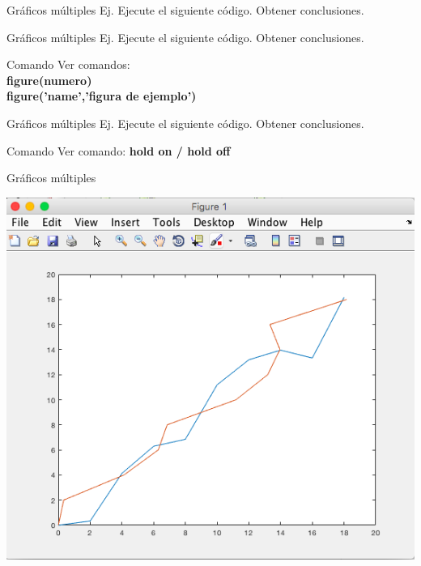 \documentclass{bredelebeamer}
\begin{document}
\begin{frame}{Gráficos múltiples}
Ej. Ejecute el siguiente código. Obtener conclusiones.

\end{frame}

\begin{frame}{Gráficos múltiples}
Ej. Ejecute el siguiente código. Obtener conclusiones.

\begin{exampleblock}{Comando}
Ver comandos:\\ \textbf{figure(numero)}\\ \textbf{figure('name','figura de ejemplo')}
\end{exampleblock}
\end{frame}

\begin{frame}{Gráficos múltiples}
Ej. Ejecute el siguiente código. Obtener conclusiones.

\begin{exampleblock}{Comando}
Ver comando: \textbf{hold on / hold off}
\end{exampleblock}
\end{frame}

\begin{frame}{Gráficos múltiples}
\begin{center}
\includegraphics[scale=0.35]{images/pantalla16.png}
\end{center}
\end{frame}
\end{document}
